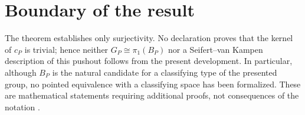 \section{Boundary of the result}

The theorem establishes only surjectivity. No declaration proves that the kernel of $c_P$ is trivial; hence neither $G_P\cong\pi_1(B_P)$ nor a Seifert--van Kampen description of this pushout follows from the present development. In particular, although $B_P$ is the natural candidate for a classifying type of the presented group, no pointed equivalence with a classifying space has been formalized. These are mathematical statements requiring additional proofs, not consequences of the notation .

